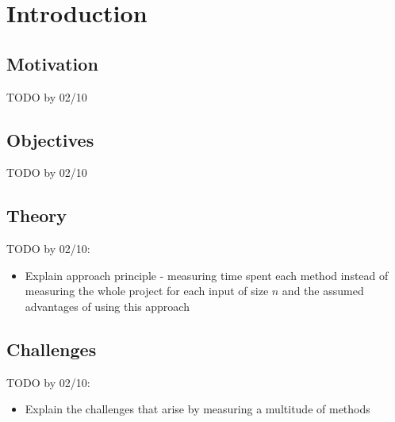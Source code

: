 \chapter{Introduction}

\section{Motivation}
TODO by 02/10

\section{Objectives}
TODO by 02/10

\section{Theory}
TODO by 02/10:
\begin{itemize}
  \item Explain approach principle - measuring time spent each method instead of measuring the whole project for each input of size $n$ and the assumed advantages of using this approach
\end{itemize}

\section{Challenges}
TODO by 02/10:
\begin{itemize}
  \item Explain the challenges that arise by measuring a multitude of methods
\end{itemize}
